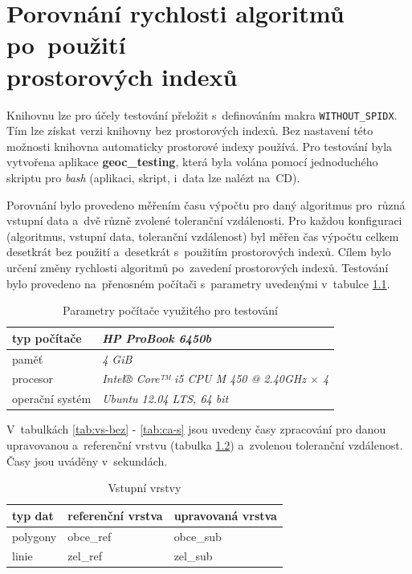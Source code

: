 \chapter[Porovnání rychlosti algoritmů]{Porovnání rychlosti algoritmů po~použití\\ prostorových indexů}
\label{priloha-testovani}

Knihovnu  lze pro účely testování přeložit s~definováním makra 
\texttt{WITHOUT\_SPIDX}. Tím lze získat verzi knihovny bez prostorových indexů.
Bez nastavení této možnosti knihovna automaticky prostorové indexy používá. 
Pro testování byla vytvořena aplikace \textbf{geoc\_testing}, která byla 
volána pomocí jednoduchého skriptu pro \textit{bash} (aplikaci, skript,
 i~data lze nalézt na~CD). 

Porovnání bylo provedeno měřením času výpočtu pro daný algoritmus
pro~různá vstup\-ní data a~dvě různě zvolené toleranční vzdálenosti.
Pro každou konfiguraci (algoritmus, vstupní data, toleranční vzdálenost)
byl měřen čas výpočtu celkem desetkrát bez použití a~desetkrát s~použitím
prostorových indexů. Cílem bylo určení změny rychlosti algoritmů po~zavedení
prostorových indexů. Testování bylo provedeno na~přenosném počítači 
s~parametry uvedenými v~tabulce \ref{tab:parametry}. 

\begin{table}[H]
 \centering
  \caption{Parametry počítače využitého pro testování}
\begin{tabular}{|l|l|}
\hline
 typ počítače & \textit{HP ProBook 6450b} \\
\hline
 paměť & \textit{4 GiB} \\
\hline
 procesor &\textit{Intel® Core™ i5 CPU M 450 @ 2.40GHz $\times$ 4 }\\
\hline
 operační systém &\textit{Ubuntu 12.04 LTS, 64 bit}\\
\hline
\end{tabular}
  \label{tab:parametry}
\end{table}

V~tabulkách \ref{tab:vs-bez} - \ref{tab:ca-s} jsou uvedeny časy zpracování pro 
danou upravovanou a~re\-ferenční vrstvu (tabulka \ref{tab:vstup}) a~zvolenou 
toleranční vzdálenost. Časy jsou uváděny v~sekundách. 

\begin{table}[H]
 \centering
  \caption{Vstupní vrstvy}
\begin{tabular}{|l|l|l|}
\hline
 typ dat & referenční vrstva & upravovaná vrstva \\
\hline
\hline
 polygony & obce\_ref & obce\_sub \\
 linie & zel\_ref & zel\_sub \\
 \hline
\end{tabular}
  \label{tab:vstup}
\end{table}

